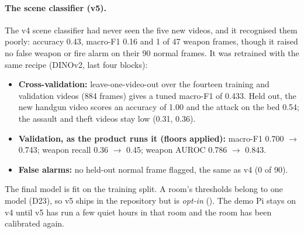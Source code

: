 \paragraph{The scene classifier (v5).} The v4 scene classifier had never seen the five new videos, and it recognised them poorly: accuracy 0.43, macro-F1 0.16 and 1 of 47 weapon frames, though it raised no false weapon or fire alarm on their 90 normal frames. It was retrained with the same recipe (DINOv2, last four blocks):
\begin{itemize}
\item \textbf{Cross-validation:} leave-one-video-out over the fourteen training and validation videos (884 frames) gives a tuned macro-F1 of 0.433. Held out, the new handgun video scores an accuracy of 1.00 and the attack on the bed 0.54; the assault and theft videos stay low (0.31, 0.36).
\item \textbf{Validation, as the product runs it (floors applied):} macro-F1 0.700 $\to$ 0.743; weapon recall 0.36 $\to$ 0.45; weapon AUROC 0.786 $\to$ 0.843.
\item \textbf{False alarms:} no held-out normal frame flagged, the same as v4 (0 of 90).
\end{itemize}
The final model is fit on the training split. A room's thresholds belong to one model (D23), so v5 ships in the repository but is \emph{opt-in} (). The demo Pi stays on v4 until v5 has run a few quiet hours in that room and the room has been calibrated again.


